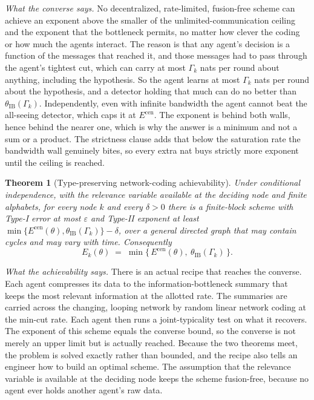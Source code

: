 \documentclass[journal]{IEEEtran}
\newtheorem{theorem}{Theorem}
\theoremstyle{definition}
\theoremstyle{remark}
\newcommand{\Ecen}{E^{\mathrm{cen}}}
\newcommand{\tib}{\theta_{\mathrm{IB}}}
\newcommand{\Gk}{\Gamma_k}
\begin{document}
\textit{What the converse says.} No decentralized, rate-limited, fusion-free scheme can achieve an exponent above
the smaller of the unlimited-communication ceiling and the exponent that the bottleneck permits, no matter how
clever the coding or how much the agents interact. The reason is that any agent's decision is a function of the
messages that reached it, and those messages had to pass through the agent's tightest cut, which can carry at most
$\Gk$ nats per round about anything, including the hypothesis. So the agent learns at most $\Gk$ nats per round
about the hypothesis, and a detector holding that much can do no better than $\tib(\Gk)$. Independently, even with
infinite bandwidth the agent cannot beat the all-seeing detector, which caps it at $\Ecen$. The exponent is behind
both walls, hence behind the nearer one, which is why the answer is a minimum and not a sum or a product. The
strictness clause adds that below the saturation rate the bandwidth wall genuinely bites, so every extra nat buys
strictly more exponent until the ceiling is reached.

\begin{theorem}[Type-preserving network-coding achievability]\label{thm:achieve}
Under conditional independence, with the relevance variable available at the deciding node and finite alphabets,
for every node $k$ and every $\delta>0$ there is a finite-block scheme with Type-I error at most $\varepsilon$ and
Type-II exponent at least $\min\{\Ecen(\theta),\tib(\Gk)\}-\delta$, over a general directed graph that may contain
cycles and may vary with time. Consequently
\begin{equation}
E_k(\theta) \;=\; \min\{\,\Ecen(\theta),\ \tib(\Gk)\,\}. \label{eq:closed}
\end{equation}
\end{theorem}

\textit{What the achievability says.} There is an actual recipe that reaches the converse. Each agent compresses
its data to the information-bottleneck summary that keeps the most relevant information at the allotted rate. The
summaries are carried across the changing, looping network by random linear network coding at the min-cut rate.
Each agent then runs a joint-typicality test on what it recovers. The exponent of this scheme equals the converse
bound, so the converse is not merely an upper limit but is actually reached. Because the two theorems meet, the
problem is solved exactly rather than bounded, and the recipe also tells an engineer how to build an optimal
scheme. The assumption that the relevance variable is available at the deciding node keeps the scheme fusion-free,
because no agent ever holds another agent's raw data.
\end{document}
